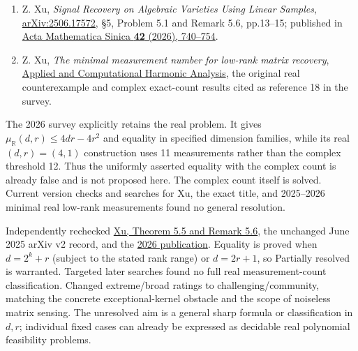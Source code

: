 \documentclass[11pt,a4paper]{article}
\makeatletter
\providecommand{\tightlist}{\setlength{\itemsep}{0pt}\setlength{\parskip}{0pt}}
\renewcommand{\subsection}{\Needspace{4\baselineskip}\@startsection{subsection}{2}{0pt}{9pt plus 1pt minus 1pt}{3pt}{\sffamily\bfseries\normalsize\color{ink}}}
\makeatother
\begin{document}
\begin{enumerate}
\def\labelenumi{\arabic{enumi}.}
\tightlist
\item
  Z. Xu, \emph{Signal Recovery on Algebraic Varieties Using Linear
  Samples}, \href{https://arxiv.org/pdf/2506.17572}{arXiv:2506.17572},
  §5, Problem 5.1 and Remark 5.6, pp.13--15; published in
  \href{https://doi.org/10.1007/s10114-026-5299-y}{Acta Mathematica
  Sinica \textbf{42} (2026), 740--754}.
\item
  Z. Xu, \emph{The minimal measurement number for low-rank matrix
  recovery}, \href{https://doi.org/10.1016/j.acha.2017.01.005}{Applied
  and Computational Harmonic Analysis}, the original real counterexample
  and complex exact-count results cited as reference 18 in the survey.
\end{enumerate}

The 2026 survey explicitly retains the real problem. It gives
\(\mu_{\mathbb R}(d,r)\leq4dr-4r^2\) and equality in specified dimension
families, while its real \((d,r)=(4,1)\) construction uses 11
measurements rather than the complex threshold 12. Thus the uniformly
asserted equality with the complex count is already false and is not
proposed here. The complex count itself is solved. Current version
checks and searches for Xu, the exact title, and 2025--2026 minimal real
low-rank measurements found no general resolution.

\subsection{Audit --- 2026-09-10}\label{audit-2026-09-10}

Independently rechecked \href{https://arxiv.org/html/2506.17572v2}{Xu,
Theorem 5.5 and Remark 5.6}, the unchanged June 2025 arXiv v2 record,
and the
\href{https://actamath.cjoe.ac.cn/Jwk_sxxb_en/EN/10.1007/s10114-026-5299-y}{2026
publication}. Equality is proved when \(d=2^k+r\) (subject to the stated
rank range) or \(d=2r+1\), so Partially resolved is warranted. Targeted
later searches found no full real measurement-count classification.
Changed extreme/broad ratings to challenging/community, matching the
concrete exceptional-kernel obstacle and the scope of noiseless matrix
sensing. The unresolved aim is a general sharp formula or classification
in \(d,r\); individual fixed cases can already be expressed as decidable
real polynomial feasibility problems.
\end{document}
